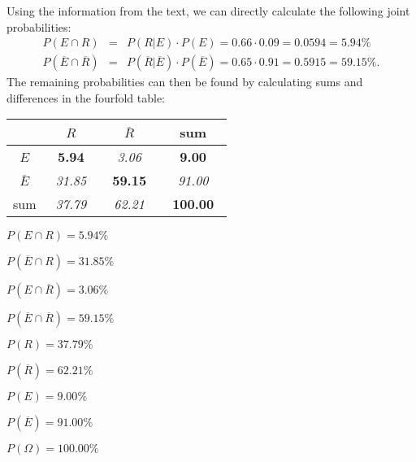 \begin{solution}
Using the information from the text, we can directly calculate the following joint probabilities:
\begin{eqnarray*}
  P(E \cap R) & = &
    P(R | E) \cdot P(E) = 0.66 \cdot 0.09 = 0.0594 = 5.94\%\\
  P(\overline{E} \cap \overline{R}) & = &
    P(\overline{R} | \overline{E}) \cdot P(\overline{E}) = 0.65 \cdot 0.91 = 0.5915 = 59.15\%.
\end{eqnarray*}
The remaining probabilities can then be found by calculating sums and differences in the fourfold table:

\begin{tabular}{|c|cc|c|}
\hline
                 & ~$R$~                    & ~$\overline{R}$~         & sum \\ \hline
~$E$~            & ~{\bf   5.94}~ & ~{\it   3.06}~ & ~{\bf   9.00}~ \\
~$\overline{E}$~ & ~{\it  31.85}~ & ~{\bf  59.15}~ & ~{\it  91.00}~ \\ \hline
sum              & ~{\it  37.79}~ & ~{\it  62.21}~ & ~{\bf 100.00}~ \\
\hline
\end{tabular}

\begin{answerlist}
  \item $P(E \cap R) =   5.94\%$
  \item $P(\overline{E} \cap R) =  31.85\%$
  \item $P(E \cap \overline{R}) =   3.06\%$
  \item $P(\overline{E} \cap \overline{R}) =  59.15\%$
  \item $P(R) =  37.79\%$
  \item $P(\overline{R}) =  62.21\%$
  \item $P(E) =   9.00\%$
  \item $P(\overline{E}) =  91.00\%$
  \item $P(\Omega) = 100.00\%$
\end{answerlist}
\end{solution}


